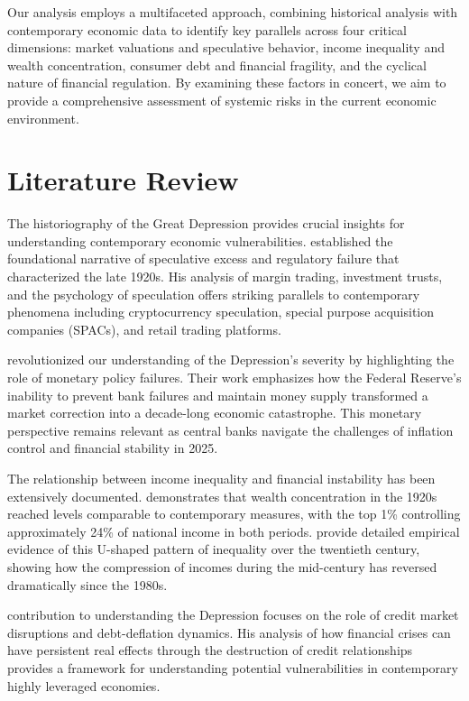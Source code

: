 \documentclass[12pt,letterpaper]{article}
\begin{document}
Our analysis employs a multifaceted approach, combining historical analysis with contemporary economic data to identify key parallels across four critical dimensions: market valuations and speculative behavior, income inequality and wealth concentration, consumer debt and financial fragility, and the cyclical nature of financial regulation. By examining these factors in concert, we aim to provide a comprehensive assessment of systemic risks in the current economic environment.

\section{Literature Review}

The historiography of the Great Depression provides crucial insights for understanding contemporary economic vulnerabilities. \cite{galbraith1954} established the foundational narrative of speculative excess and regulatory failure that characterized the late 1920s. His analysis of margin trading, investment trusts, and the psychology of speculation offers striking parallels to contemporary phenomena including cryptocurrency speculation, special purpose acquisition companies (SPACs), and retail trading platforms.

\cite{friedman1963} revolutionized our understanding of the Depression's severity by highlighting the role of monetary policy failures. Their work emphasizes how the Federal Reserve's inability to prevent bank failures and maintain money supply transformed a market correction into a decade-long economic catastrophe. This monetary perspective remains relevant as central banks navigate the challenges of inflation control and financial stability in 2025.

The relationship between income inequality and financial instability has been extensively documented. \cite{piketty2014} demonstrates that wealth concentration in the 1920s reached levels comparable to contemporary measures, with the top 1\% controlling approximately 24\% of national income in both periods. \cite{saez2003} provide detailed empirical evidence of this U-shaped pattern of inequality over the twentieth century, showing how the compression of incomes during the mid-century has reversed dramatically since the 1980s.

\cite{bernanke1983} contribution to understanding the Depression focuses on the role of credit market disruptions and debt-deflation dynamics. His analysis of how financial crises can have persistent real effects through the destruction of credit relationships provides a framework for understanding potential vulnerabilities in contemporary highly leveraged economies.
\end{document}
